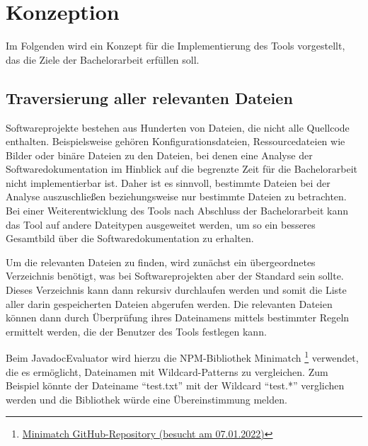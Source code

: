 \chapter{Konzeption}
Im Folgenden wird ein Konzept für die Implementierung des Tools vorgestellt, das  die Ziele der Bachelorarbeit erfüllen soll.
\section{Traversierung aller relevanten Dateien} 
Softwareprojekte bestehen aus Hunderten von Dateien, die nicht alle Quellcode enthalten. Beispielsweise gehören Konfigurationsdateien, Ressourcedateien wie Bilder oder binäre Dateien zu den Dateien, bei denen eine Analyse der Softwaredokumentation im Hinblick auf die begrenzte Zeit für die Bachelorarbeit nicht implementierbar ist. Daher ist es sinnvoll, bestimmte Dateien bei der Analyse auszuschließen beziehungsweise nur bestimmte Dateien zu betrachten. Bei einer Weiterentwicklung des Tools nach Abschluss der Bachelorarbeit kann das Tool auf andere Dateitypen ausgeweitet werden, um so ein besseres Gesamtbild über die Softwaredokumentation zu erhalten.

Um die relevanten Dateien zu finden, wird zunächst ein übergeordnetes Verzeichnis benötigt, was bei Softwareprojekten aber der Standard sein sollte. Dieses Verzeichnis kann dann rekursiv durchlaufen werden und somit die Liste aller darin gespeicherten Dateien abgerufen werden. Die relevanten Dateien können dann durch Überprüfung ihres Dateinamens mittels bestimmter Regeln ermittelt werden, die der Benutzer des Tools festlegen kann.

Beim JavadocEvaluator wird hierzu die NPM-Bibliothek Minimatch \footnote{\href{https://github.com/isaacs/minimatch}{Minimatch GitHub-Repository (besucht am 07.01.2022)}} verwendet, die es ermöglicht, Dateinamen mit Wildcard-Patterns zu vergleichen. Zum Beispiel könnte der Dateiname \enquote{test.txt} mit der Wildcard \enquote{test.*} verglichen werden und die Bibliothek würde eine Übereinstimmung melden.

